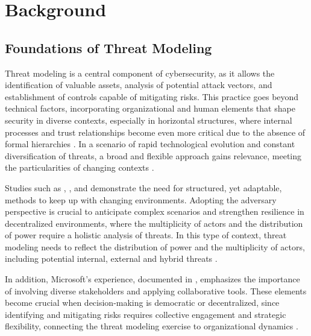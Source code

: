 
%

\chapter{Background}
\label{cha:background}

\glsresetall

\section{Foundations of Threat Modeling}
\label{sec:foundations_threat_modeling}

Threat modeling is a central component of cybersecurity, as it allows the
identification of valuable assets, analysis of potential attack vectors, and
establishment of controls capable of mitigating risks. This practice goes beyond
technical factors, incorporating organizational and human elements that shape
security in diverse contexts, especially in horizontal structures, where
internal processes and trust relationships become even more critical due to the
absence of formal hierarchies \cite{Colbac}. In a scenario of rapid
technological evolution and constant diversification of threats, a broad and
flexible approach gains relevance, meeting the particularities of changing
contexts \cite{ThreatModelingdesigningForSecurity}.

Studies such as \cite{ThreatModelingAsABasisForSecurityRequirements},
\cite{AdvancedThreatModeling}, and \cite{DemystifyingTheThreatModelingProcess}
demonstrate the need for structured, yet adaptable, methods to keep up with
changing environments. Adopting the adversary perspective
\cite{AHybridThreatModelingMethod} is crucial to anticipate complex scenarios
and strengthen resilience in decentralized environments, where the multiplicity
of actors and the distribution of power require a holistic analysis of threats.
In this type of context, threat modeling needs to reflect the distribution of
power and the multiplicity of actors, including potential internal, external and
hybrid threats \cite{ThreatModelingASummaryOfAvailableMethods}.

In addition, Microsoft's experience, documented in
\cite{ExperiencesThreatModelingAtMicrosoft}, emphasizes the importance of
involving diverse stakeholders and applying collaborative tools. These elements
become crucial when decision-making is democratic or decentralized, since
identifying and mitigating risks requires collective engagement and strategic
flexibility, connecting the threat modeling exercise to organizational dynamics
\cite{ParticipatoryThreatModelling}.

